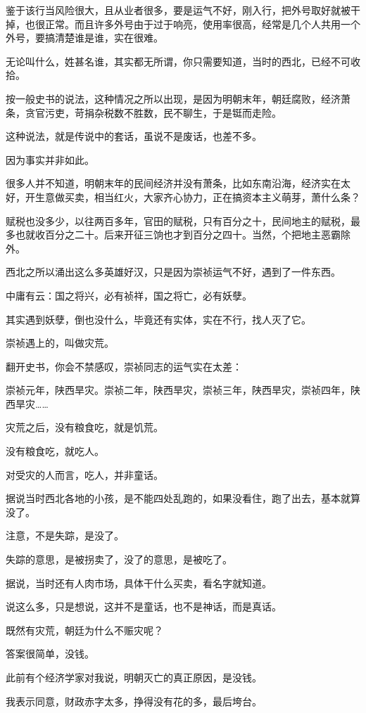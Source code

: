 \begin{multicols}{\theparacolNo}
鉴于该行当风险很大，且从业者很多，要是运气不好，刚入行，把外号取好就被干掉，也很正常。而且许多外号由于过于响亮，使用率很高，经常是几个人共用一个外号，要搞清楚谁是谁，实在很难。

无论叫什么，姓甚名谁，其实都无所谓，你只需要知道，当时的西北，已经不可收拾。

按一般史书的说法，这种情况之所以出现，是因为明朝末年，朝廷腐败，经济萧条，贪官污吏，苛捐杂税数不胜数，民不聊生，于是铤而走险。

这种说法，就是传说中的套话，虽说不是废话，也差不多。

因为事实并非如此。

很多人并不知道，明朝末年的民间经济并没有萧条，比如东南沿海，经济实在太好，开生意做买卖，相当红火，大家齐心协力，正在搞资本主义萌芽，萧什么条？

赋税也没多少，以往两百多年，官田的赋税，只有百分之十，民间地主的赋税，最多也就收百分之二十。后来开征三饷也才到百分之四十。当然，个把地主恶霸除外。

西北之所以涌出这么多英雄好汉，只是因为崇祯运气不好，遇到了一件东西。

中庸有云：国之将兴，必有祯祥，国之将亡，必有妖孽。

其实遇到妖孽，倒也没什么，毕竟还有实体，实在不行，找人灭了它。

崇祯遇上的，叫做灾荒。

翻开史书，你会不禁感叹，崇祯同志的运气实在太差：

崇祯元年，陕西旱灾。崇祯二年，陕西旱灾，崇祯三年，陕西旱灾，崇祯四年，陕西旱灾……

灾荒之后，没有粮食吃，就是饥荒。

没有粮食吃，就吃人。

对受灾的人而言，吃人，并非童话。

据说当时西北各地的小孩，是不能四处乱跑的，如果没看住，跑了出去，基本就算没了。

注意，不是失踪，是没了。

失踪的意思，是被拐卖了，没了的意思，是被吃了。

据说，当时还有人肉市场，具体干什么买卖，看名字就知道。

说这么多，只是想说，这并不是童话，也不是神话，而是真话。

既然有灾荒，朝廷为什么不赈灾呢？

答案很简单，没钱。

此前有个经济学家对我说，明朝灭亡的真正原因，是没钱。

我表示同意，财政赤字太多，挣得没有花的多，最后垮台。


\end{multicols}
